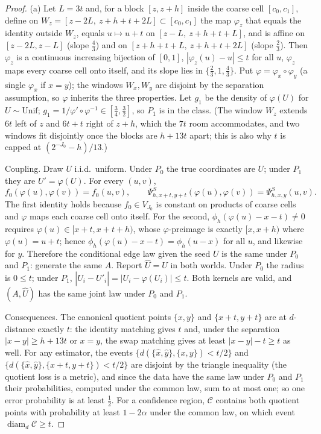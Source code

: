 \documentclass[11pt]{article}
\theoremstyle{definition}
\newcommand{\1}{\mathbf 1}\newcommand{\op}{\operatorname}
\begin{document}
\begin{proof}
(a) Let $L=3t$ and, for a block $[z,z+h]$ inside the coarse cell
$[c_0,c_1]$, define on $W_z=[z-2L,\ z+h+t+2L]\subset[c_0,c_1]$ the map
$\varphi_z$ that equals the identity outside $W_z$, equals $u\mapsto u+t$ on
$[z-L,\ z+h+t+L]$, and is affine on $[z-2L,z-L]$ (slope $\tfrac43$) and on
$[z+h+t+L,\ z+h+t+2L]$ (slope $\tfrac23$).  Then $\varphi_z$ is a
continuous increasing bijection of $[0,1]$, $|\varphi_z(u)-u|\le t$ for all
$u$, $\varphi_z$ maps every coarse cell onto itself, and its slope lies in
$\{\tfrac23,1,\tfrac43\}$.  Put $\varphi=\varphi_x\circ\varphi_y$ (a single
$\varphi_x$ if $x=y$); the windows $W_x,W_y$ are disjoint by the separation
assumption, so $\varphi$ inherits the three properties.  Let $g_1$ be the
density of $\varphi(U)$ for $U\sim\mathrm{Unif}$;
$g_1=1/\varphi'\circ\varphi^{-1}\in[\tfrac34,\tfrac32]$, so $P_1$ is in the
class.  (The window $W_z$ extends $6t$ left of $z$ and $6t+t$ right of $z+h$,
which the $7t$ room accommodates, and two windows fit disjointly once the
blocks are $h+13t$ apart; this is also why $t$ is capped at
$(2^{-J_0}-h)/13$.)

Coupling.  Draw $U$ i.i.d.\ uniform.  Under $P_0$ the true coordinates are
$U$; under $P_1$ they are $U'=\varphi(U)$.  For every $(u,v)$,
\[
f_0(\varphi(u),\varphi(v))=f_0(u,v),
\qquad
\Psi^S_{h,x+t,y+t}(\varphi(u),\varphi(v))=\Psi^S_{h,x,y}(u,v).
\]
The first identity holds because $f_0\in V_{J_0}$ is constant on products of
coarse cells and $\varphi$ maps each coarse cell onto itself.  For the second,
$\phi_h(\varphi(u)-x-t)\ne0$ requires $\varphi(u)\in[x+t,x+t+h)$, whose
$\varphi$-preimage is exactly $[x,x+h)$ where $\varphi(u)=u+t$; hence
$\phi_h(\varphi(u)-x-t)=\phi_h(u-x)$ for all $u$, and likewise for $y$.
Therefore the conditional edge law given the seed $U$ is the same under $P_0$
and $P_1$: generate the same $A$.  Report $\widehat U=U$ in both worlds.
Under $P_0$ the radius is $0\le t$; under $P_1$,
$|\widehat U_i-U'_i|=|U_i-\varphi(U_i)|\le t$.  Both kernels are valid, and
$(A,\widehat U)$ has the same joint law under $P_0$ and $P_1$.

Consequences.  The canonical quotient points $\{x,y\}$ and $\{x+t,y+t\}$ are at
$d$-distance exactly $t$: the identity matching gives $t$ and, under the
separation $|x-y|\ge h+13t$ or $x=y$, the swap matching gives at least
$|x-y|-t\ge t$ as well.  For any estimator, the events
$\{d(\{\widehat x,\widehat y\},\{x,y\})<t/2\}$ and
$\{d(\{\widehat x,\widehat y\},\{x+t,y+t\})<t/2\}$ are disjoint by the
triangle inequality (the quotient loss is a metric), and since the data have
the same law under $P_0$ and $P_1$ their probabilities, computed under the
common law, sum to at most one; so one error probability is at least
$\tfrac12$.  For a confidence region, $\mathcal C$ contains both quotient
points with probability at least $1-2\alpha$ under the common law, on which
event $\operatorname{diam}_d\mathcal C\ge t$.


\end{proof}
\end{document}
